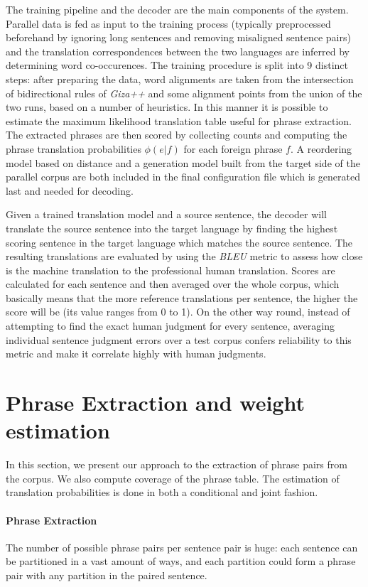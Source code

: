 \documentclass[11pt]{article}
\begin{document}
The training pipeline and the decoder are the main components of the system. Parallel data is fed as input to the training process (typically preprocessed beforehand by ignoring long sentences and removing misaligned sentence pairs) and the translation correspondences between the two languages are inferred by determining word co-occurences. The training procedure is split into 9 distinct steps: after preparing the data, word alignments are taken from the intersection of bidirectional rules of \textit{Giza++} and some alignment points from the union of the two runs, based on a number of heuristics. In this manner it is possible to estimate the maximum likelihood translation table useful for phrase extraction. The extracted phrases are then scored by collecting counts and computing the phrase translation probabilities $\phi(e|f)$ for each foreign phrase $f$. A reordering model based on distance and a generation model built from the target side of the parallel corpus are both included in the final configuration file which is generated last and needed for decoding.

Given a trained translation model and a source sentence, the decoder will translate the source sentence into the target language by finding the highest scoring sentence in the target language which matches the source sentence. The resulting translations are evaluated by using the \textit{BLEU} metric to assess how close is the machine translation to the professional human translation. Scores are calculated for each sentence and then averaged over the whole corpus, which basically means that the more reference translations per sentence, the higher the score will be (its value ranges from 0 to 1). On the other way round, instead of attempting to find the exact human judgment for every sentence, averaging individual sentence judgment errors over a test corpus confers reliability to this metric and make it correlate highly with human judgments.


\section{Phrase Extraction and weight estimation}
\label{phraseExtraction}

In this section, we present our approach to the extraction of phrase pairs from the corpus. We also compute coverage of the phrase table. The estimation of translation probabilities is done in both a conditional and joint fashion.

\paragraph{Phrase Extraction}
The number of possible phrase pairs per sentence pair is huge: each sentence can be partitioned in a vast amount of ways, and each partition could form a phrase pair with any partition in the paired sentence. 
\end{document}

